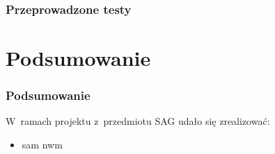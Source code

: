 \documentclass{beamer}
\begin{document}
\begin{frame}
    \frametitle{Przeprowadzone testy}

\end{frame}

\section{Podsumowanie}
\begin{frame}
    \frametitle{Podsumowanie}
    W~ramach projektu z~przedmiotu SAG udało się zrealizować:
    \begin{itemize}
        \item sam nwm
    \end{itemize}
\end{frame}
\end{document}

